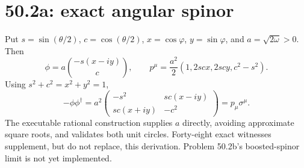 \documentclass{article}
\begin{document}
\section*{50.2a: exact angular spinor}
Put $s=\sin(\theta/2)$, $c=\cos(\theta/2)$,
$x=\cos\varphi$, $y=\sin\varphi$, and $a=\sqrt{2\omega}>0$.
Then
\[
 \phi=a\binom{-s(x-iy)}{c},\qquad
 p^\mu=\frac{a^2}{2}(1,2scx,2scy,c^2-s^2).
\]
Using $s^2+c^2=x^2+y^2=1$,
\[
 -\phi\phi^\dagger
 =a^2\begin{pmatrix}-s^2&sc(x-iy)\\sc(x+iy)&-c^2\end{pmatrix}
 =p_\mu\sigma^\mu .
\]
The executable rational construction supplies $a$ directly, avoiding
approximate square roots, and validates both unit circles.
Forty-eight exact witnesses supplement, but do not replace, this derivation.
Problem 50.2b's boosted-spinor limit is not yet implemented.
\end{document}
